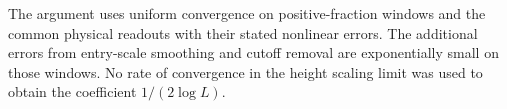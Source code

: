 The argument uses uniform convergence on positive-fraction windows
and the common physical readouts with their stated nonlinear errors.
The additional errors from entry-scale smoothing
and cutoff removal are exponentially small on those windows.
No rate of convergence in the height scaling limit was used to
obtain the coefficient $1/(2\log L)$.
